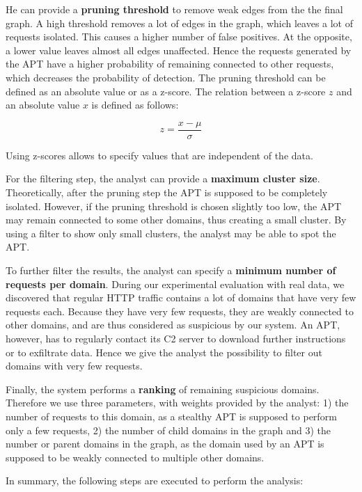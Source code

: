 \documentclass[conference]{IEEEtran}
\begin{document}
He can provide a \textbf{pruning threshold} to remove weak edges from the the final graph. A high threshold removes a lot of edges in the graph, which leaves a lot of requests isolated. This causes a higher number of false positives. At the opposite, a lower value leaves almost all edges unaffected. Hence the requests generated by the APT have a higher probability of remaining connected to other requests, which decreases the probability of detection. The pruning threshold can be defined as an absolute value or as a z-score. The relation between a z-score $z$ and an absolute value $x$ is defined as follows:

$$ z = \frac{x - \mu}{\sigma} $$

Using z-scores allows to specify values that are independent of the data.

For the filtering step, the analyst can provide a \textbf{maximum cluster size}. Theoretically, after the pruning step the APT is supposed to be completely isolated. However, if the pruning threshold is chosen slightly too low, the APT may remain connected to some other domains, thus creating a small cluster. By using a filter to show only small clusters, the analyst may be able to spot the APT.

To further filter the results, the analyst can specify a \textbf{minimum number of requests per domain}. During our experimental evaluation with real data, we discovered that regular HTTP traffic contains a lot of domains that have very few requests each. Because they have very few requests, they are weakly connected to other domains, and are thus considered as suspicious by our system. An APT, however, has to regularly contact its C2 server to download further instructions or to exfiltrate data. Hence we give the analyst the possibility to filter out domains with very few requests.

Finally, the system performs a \textbf{ranking} of remaining suspicious domains. Therefore we use three parameters, with weights provided by the analyst: 1) the number of requests to this domain, as a stealthy APT is supposed to perform only a few requests, 2) the number of child domains in the graph and 3) the number or parent domains in the graph, as the domain used by an APT is supposed to be weakly connected to multiple other domains.

In summary, the following steps are executed to perform the analysis:
\end{document}

